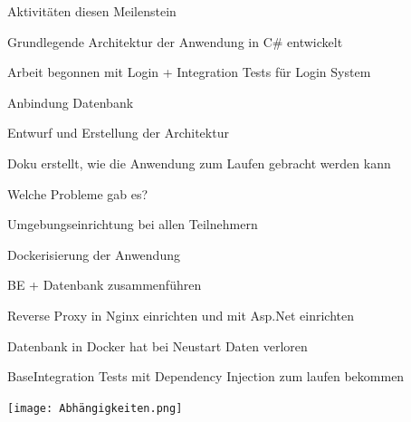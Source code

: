 \documentclass{beamer}
\begin{document}
\begin{frame}
    \begin{description}[font=$\bullet$]
        \item Aktivitäten diesen Meilenstein
              \begin{description}[font=$\bullet$]
                  \item Grundlegende Architektur der Anwendung in C\# entwickelt
                  \item Arbeit begonnen mit Login + Integration Tests für Login System
                  \item Anbindung Datenbank
                  \item Entwurf und Erstellung der Architektur
                  \item Doku erstellt, wie die Anwendung zum Laufen gebracht werden kann
              \end{description}



        \item Welche Probleme gab es?
              \begin{description}[font=$\bullet$]
                  \item Umgebungseinrichtung bei allen Teilnehmern
                  \item Dockerisierung der Anwendung
                  \item BE + Datenbank zusammenführen
                  \item Reverse Proxy in Nginx einrichten und mit Asp.Net einrichten
                  \item Datenbank in Docker hat bei Neustart Daten verloren
                  \item BaseIntegration Tests mit Dependency Injection zum laufen bekommen
              \end{description}
    \end{description}
\end{frame}
\begin{frame}
    \texttt{[image: Abhängigkeiten.png]}
\end{frame}
\end{document}
